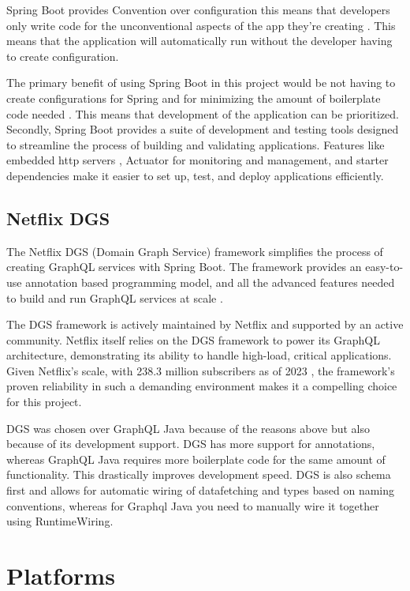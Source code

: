 \documentclass[]{project_report}
\begin{document}
Spring Boot provides Convention over configuration \cite{spring_boot} this means that developers only write code for the unconventional aspects of the app they're creating \cite{spring_boot}. This means that the application will automatically run without the developer having to create configuration.

The primary benefit of using Spring Boot in this project would be not having to create configurations for Spring and for minimizing the amount of boilerplate code needed \cite{spring_boot}. This means that development of the application can be prioritized. Secondly, Spring Boot provides a suite of development and testing tools designed to streamline the process of building and validating applications. Features like embedded http servers \cite{spring_boot}, Actuator for monitoring and management, and starter dependencies make it easier to set up, test, and deploy applications efficiently.

\subsection{Netflix DGS}

The Netflix DGS (Domain Graph Service) framework simplifies the process of creating GraphQL services with Spring Boot. The framework provides an easy-to-use annotation based programming model, and all the advanced features needed to build and run GraphQL services at scale \cite{dgs}. 

The DGS framework is actively maintained by Netflix and supported by an active community. Netflix itself relies on the DGS framework to power its GraphQL architecture, demonstrating its ability to handle high-load, critical applications. Given Netflix's scale, with 238.3 million subscribers as of 2023 \cite{netflix_stats}, the framework's proven reliability in such a demanding environment makes it a compelling choice for this project.

DGS was chosen over GraphQL Java because of the reasons above but also because of its development support. DGS has more support for annotations, whereas GraphQL Java requires more boilerplate code for the same amount of functionality. This drastically improves development speed. DGS is also schema first and allows for automatic wiring of datafetching and types based on naming conventions, whereas for Graphql Java you need to manually wire it together using RuntimeWiring. 

\section{Platforms}
\end{document}
